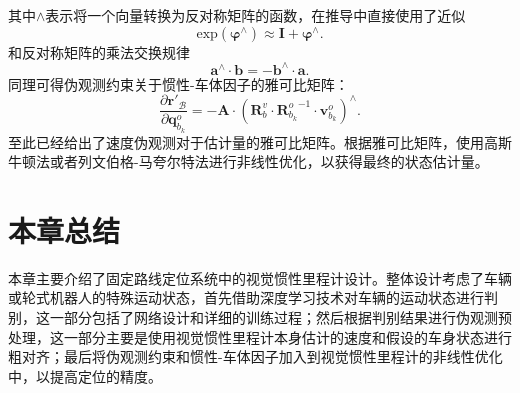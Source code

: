 其中${\land}$表示将一个向量转换为反对称矩阵的函数，在推导中直接使用了近似
\begin{equation}
  \text{exp}(\symbf{\varphi }^{\land}) \approx \symbf{I} + \symbf{\varphi }^{\land}.
\end{equation}
和反对称矩阵的乘法交换规律
\begin{equation}
  \symbf{a}^{\land} \cdot \symbf{b} = -\symbf{b}^{\land} \cdot \symbf{a}.
\end{equation}
同理可得伪观测约束关于惯性-车体因子的雅可比矩阵：
\begin{equation}
  \frac{\partial \symbf{r}'_{\mathcal{B}}}{\partial \symbf{q}_{b_{k}}^o} = -\symbf{A} \cdot (\symbf{R}_b^v \cdot {\symbf{R}_{b_k}^o}^{-1} \cdot \symbf{v}_{b_k}^o)^{\land}.
\end{equation}
至此已经给出了速度伪观测对于估计量的雅可比矩阵。根据雅可比矩阵，使用高斯牛顿法或者列文伯格-马夸尔特法进行非线性优化，以获得最终的状态估计量。

\section{本章总结}
本章主要介绍了固定路线定位系统中的视觉惯性里程计设计。整体设计考虑了车辆或轮式机器人的特殊运动状态，首先借助深度学习技术对车辆的运动状态进行判别，这一部分包括了网络设计和详细的训练过程；然后根据判别结果进行伪观测预处理，这一部分主要是使用视觉惯性里程计本身估计的速度和假设的车身状态进行粗对齐；最后将伪观测约束和惯性-车体因子加入到视觉惯性里程计的非线性优化中，以提高定位的精度。